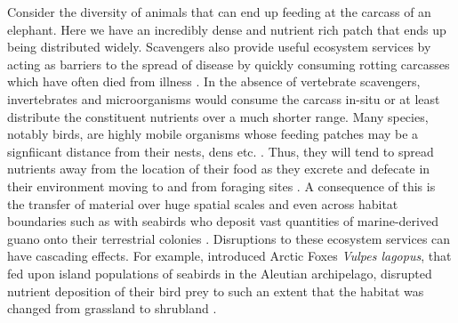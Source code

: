 \documentclass[12pt,letterpaper]{article}
\begin{document}
Consider the diversity of animals that can end up feeding at the carcass of an elephant.
Here we have an incredibly dense and nutrient rich patch that ends up being distributed widely.
Scavengers also provide useful ecosystem services by acting as barriers to the spread of disease by quickly consuming rotting carcasses which have often died from illness \cite{ogada2012dropping}.
In the absence of vertebrate scavengers, invertebrates and microorganisms would consume the carcass in-situ or at least distribute the constituent nutrients over a much shorter range.
Many species, notably birds, are highly mobile organisms whose feeding patches may be a signfiicant distance from their nests, dens etc. \cite{peery2000factors}. 
Thus, they will tend to spread nutrients away from the location of their food as they excrete and defecate in their environment moving to and from foraging sites \cite{beasley2015vertebrates}. 
A consequence of this is the transfer of material over huge spatial scales and even across habitat boundaries such as with seabirds who deposit vast quantities of marine-derived guano onto their terrestrial colonies \cite{crollfox2015}. 
Disruptions to these ecosystem services can have cascading effects. 
For example, introduced Arctic Foxes \textit{Vulpes lagopus}, that fed upon island populations of seabirds in the Aleutian archipelago, disrupted nutrient deposition of their bird prey to such an extent that the habitat was changed from  grassland to shrubland \cite{crollfox2015}. 
\end{document}
